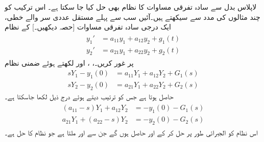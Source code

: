 لاپلاس بدل سے سادہ تفرقی مساوات کا نظام بھی حل کیا جا سکتا ہے۔ اس ترکیب کو چند مثالوں کی مدد سے سیکھتے ہیں۔آئیں سب سے پہلے مستقل عددی سر والے خطی، ایک درجی سادہ تفرقی مساوات [حصہ  دیکھیں۔] کے نظام
\begin{gather}
\begin{aligned}\label{مساوات_لاپلاس_نظام_خطی_ایک_درجی_الف}
y_1'&=a_{11}y_1+a_{12}y_2+g_1(t)\\
y_2'&=a_{21}y_1+a_{22}y_2+g_2(t)
\end{aligned}
\end{gather}
پر غور کریں۔، ،  اور  لکھتے ہوئے ضمنی نظام
\begin{align*}
sY_1-y_1(0)&=a_{11}Y_1+a_{12}Y_2+G_1(s)\\
sY_2-y_2(0)&=a_{21}Y_1+a_{22}Y_2+G_2(s)
\end{align*}
حاصل ہوتا ہے جس کو ترتیب دیتے ہوئے  درج ذیل لکھا جاسکتا ہے۔
 \begin{gather}
\begin{aligned}\label{مساوات_لاپلاس_نظام_خطی_ایک_درجی_ب}
(a_{11}-s)Y_1+a_{12}Y_2&=-y_1(0)-G_1(s)\\
a_{21}Y_1+(a_{22}-s)Y_2&=-y_2(0)-G_2(s)
\end{aligned}
\end{gather}
اس نظام کو الجبرائی طور پر حل کر کے  اور  حاصل ہوں گے جن سے  اور   ملتا ہے جو نظام کا حل ہے۔

